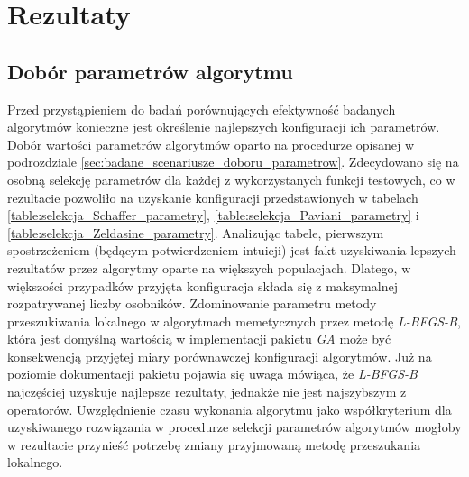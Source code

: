 \chapter{Rezultaty}
\section{Dobór parametrów algorytmu}
Przed przystąpieniem do badań porównujących efektywność badanych algorytmów konieczne jest określenie najlepszych konfiguracji ich parametrów. Dobór wartości parametrów algorytmów oparto na procedurze opisanej w podrozdziale \ref{sec:badane_scenariusze_doboru_parametrow}. Zdecydowano się na osobną selekcję parametrów dla każdej z wykorzystanych funkcji testowych, co w rezultacie pozwoliło na uzyskanie konfiguracji przedstawionych w tabelach \ref{table:selekcja_Schaffer_parametry}, \ref{table:selekcja_Paviani_parametry} i \ref{table:selekcja_Zeldasine_parametry}. Analizując tabele, pierwszym spostrzeżeniem (będącym potwierdzeniem intuicji) jest fakt uzyskiwania lepszych rezultatów przez algorytmy oparte na większych populacjach. Dlatego, w większości przypadków przyjęta konfiguracja składa się z maksymalnej rozpatrywanej liczby osobników. Zdominowanie parametru metody przeszukiwania lokalnego w algorytmach memetycznych przez metodę \emph{L-BFGS-B}, która jest domyślną wartością w implementacji pakietu \emph{GA} może być konsekwencją przyjętej miary porównawczej konfiguracji algorytmów. Już na poziomie dokumentacji pakietu pojawia się uwaga mówiąca, że \emph{L-BFGS-B} najczęściej uzyskuje najlepsze rezultaty, jednakże nie jest najszybszym z operatorów. Uwzględnienie czasu wykonania algorytmu jako współkryterium dla uzyskiwanego rozwiązania w procedurze selekcji parametrów algorytmów mogłoby w rezultacie przynieść potrzebę zmiany przyjmowaną metodę przeszukania lokalnego.

